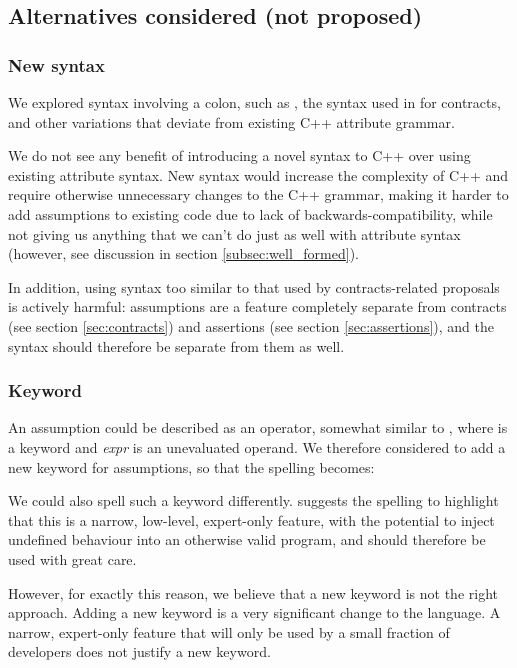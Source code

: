 \subsection{Alternatives considered (not proposed)}
\label{subsec:syntax_alternatives}

\subsubsection{New syntax}

We explored syntax involving a colon, such as , the syntax used in \cite{P0542R5} for contracts, and other variations that deviate from existing C++ attribute grammar. 

We do not see any benefit of introducing a novel syntax to C++ over using existing attribute syntax. New syntax would increase the complexity of C++ and require otherwise unnecessary changes to the C++ grammar, making it harder to add assumptions to existing code due to lack of backwards-compatibility, while not giving us anything that we can't do just as well with attribute syntax (however, see discussion in section \ref{subsec:well_formed}).

In addition, using syntax too similar to that used by contracts-related proposals is actively harmful: assumptions are a feature completely separate from contracts (see section \ref{sec:contracts}) and assertions (see section \ref{sec:assertions}), and the syntax should therefore be separate from them as well.

\subsubsection{Keyword}

An assumption could be described as an operator, somewhat similar to , where  is a keyword and \emph{expr} is an unevaluated operand. We therefore considered to add a new keyword for assumptions, so that the spelling becomes:

\forceindent
{}

We could also spell such a keyword differently. \cite{P2064R0} suggests the spelling  to highlight that this is a narrow, low-level, expert-only feature, with the potential to inject undefined behaviour into an otherwise valid program, and should therefore be used with great care.

However, for exactly this reason, we believe that a new keyword is not the right approach. Adding a new keyword is a very significant change to the language. A narrow, expert-only feature that will only be used by a small fraction of developers does not justify a new keyword.

